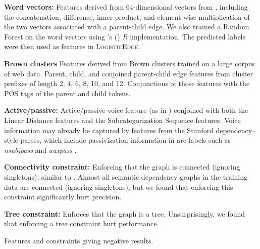 \documentclass[11pt]{article}
\newcommand{\citeposs}[1]{\citeauthor{#1}'s (\citeyear{#1})}
\newcommand{\logitedge}{\textsc{LogisticEdge}}
\begin{document}
\begin{savenotes}
\begin{table}
\small
\begin{framed}

\textbf{Word vectors:} Features derived from 64-dimensional vectors from  \citep{wordVectors}, including the
concatenation, difference, inner product, and element-wise multiplication of
the two vectors associated with a parent-child edge. We also trained a Random
Forest on the word vectors using \citeposs{RandomForest2002} \emph{R}
implementation.
The predicted labels were then used as features in \logitedge.

\textbf{Brown clusters} Features derived from Brown clusters \citep{Brown:1992:CNG:176313.176316}
trained on a large corpus of web data. Parent, child, and conjoined parent-child
edge features from cluster prefixes of length 2, 4, 6, 8, 10, and 12.
Conjunctions of those features with the POS tags of the parent and child tokens.

\textbf{Active/passive:} Active/passive voice feature
(as in \citet{johansson_dependency-based_2008}) conjoined with both the Linear
Distance features and the Subcategorization Sequence features.
Voice information may already be captured by features from the Stanford
dependency--style parses, which include passivization information in arc labels such as \emph{nsubjpass} and
\emph{auxpass} \citep{Marneffe2008DepColing}.


\textbf{Connectivity constraint:} Enforcing that the graph is connected (ignoring singletons), similar
to \citet{flanigan-etal:ACL2014}. Almost all semantic dependency graphs in the
training data are connected (ignoring singletons), but we found that enforcing
this constraint significantly hurt precision.

\textbf{Tree constraint:} Enforces that the graph is a tree. Unsurprisingly, we found that enforcing a tree constraint hurt performance.

\end{framed}
\small
\caption{Features and constraints giving negative results.}
\label{table:negedgefeatures}
\end{table}
\end{savenotes}

\end{document}
